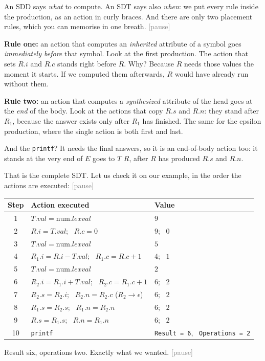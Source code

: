 \documentclass[11pt,a4paper]{article}
\newcommand{\pause}{\textcolor{gray}{\textsf{[pause]}}}
\begin{document}
\begin{narration}
An SDD says \emph{what} to compute. An SDT says also \emph{when}: we put every rule inside the production, as an action in curly braces. And there are only two placement rules, which you can memorise in one breath. \pause

\textbf{Rule one:} an action that computes an \emph{inherited} attribute of a symbol goes \emph{immediately before} that symbol. Look at the first production. The action that sets $R.i$ and $R.c$ stands right before $R$. Why? Because $R$ needs those values the moment it starts. If we computed them afterwards, $R$ would have already run without them.

\textbf{Rule two:} an action that computes a \emph{synthesized} attribute of the head goes at the \emph{end} of the body. Look at the actions that copy $R.s$ and $R.n$: they stand after $R_1$, because the answer exists only after $R_1$ has finished. The same for the epsilon production, where the single action is both first and last.

And the \texttt{printf}? It needs the final answers, so it is an end-of-body action too: it stands at the very end of $E$ goes to $T$ $R$, after $R$ has produced $R.s$ and $R.n$.

That is the complete SDT. Let us check it on our example, in the order the actions are executed: \pause
\begin{center}
\small
\begin{tabular}{@{}c l l@{}}
\toprule
\textbf{Step} & \textbf{Action executed} & \textbf{Value} \\ \midrule
1 & $T.val=\text{num}.lexval$ & $9$ \\
2 & $R.i=T.val$; \ $R.c=0$ & $9$; \ $0$ \\
3 & $T.val=\text{num}.lexval$ & $5$ \\
4 & $R_1.i=R.i-T.val$; \ $R_1.c=R.c+1$ & $4$; \ $1$ \\
5 & $T.val=\text{num}.lexval$ & $2$ \\
6 & $R_2.i=R_1.i+T.val$; \ $R_2.c=R_1.c+1$ & $6$; \ $2$ \\
7 & $R_2.s=R_2.i$; \ $R_2.n=R_2.c$ \quad ($R_2\to\epsilon$) & $6$; \ $2$ \\
8 & $R_1.s=R_2.s$; \ $R_1.n=R_2.n$ & $6$; \ $2$ \\
9 & $R.s=R_1.s$; \ $R.n=R_1.n$ & $6$; \ $2$ \\
10 & \texttt{printf} & \texttt{Result = 6}, \ \texttt{Operations = 2} \\ \bottomrule
\end{tabular}
\end{center}
Result six, operations two. Exactly what we wanted. \pause
\end{narration}
\end{document}
